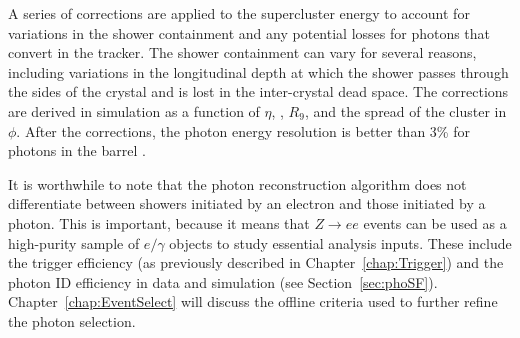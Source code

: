 A series of corrections are applied to the supercluster energy to account for variations in the shower containment and any potential losses for photons that convert in the tracker. The shower containment can vary for several reasons, including variations in the longitudinal depth at which the shower passes through the sides of the crystal and is lost in the inter-crystal dead space. The corrections are derived in simulation as a function of $\eta$, \ET, $R_9$, and the spread of the cluster in $\phi$. After the corrections, the photon energy resolution is better than 3\% for photons in the barrel \cite{phoPerf8TeV}.

It is worthwhile to note that the photon reconstruction algorithm does not differentiate between showers initiated by an electron and those initiated by a photon. This is important, because it means that $Z \rightarrow ee$ events can be used as a high-purity sample of $e/\gamma$ objects to study essential analysis inputs. These include the trigger efficiency (as previously described in Chapter~\ref{chap:Trigger}) and the photon ID efficiency in data and simulation (see Section~\ref{sec:phoSF}). Chapter~\ref{chap:EventSelect} will discuss the offline criteria used to further refine the photon selection.
